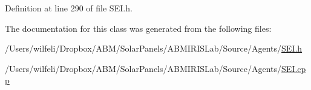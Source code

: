 Definition at line 290 of file S\+E\+I.\+h.



The documentation for this class was generated from the following files\+:\begin{DoxyCompactItemize}
\item 
/\+Users/wilfeli/\+Dropbox/\+A\+B\+M/\+Solar\+Panels/\+A\+B\+M\+I\+R\+I\+S\+Lab/\+Source/\+Agents/\hyperlink{_s_e_i_8h}{S\+E\+I.\+h}\item 
/\+Users/wilfeli/\+Dropbox/\+A\+B\+M/\+Solar\+Panels/\+A\+B\+M\+I\+R\+I\+S\+Lab/\+Source/\+Agents/\hyperlink{_s_e_i_8cpp}{S\+E\+I.\+cpp}\end{DoxyCompactItemize}
